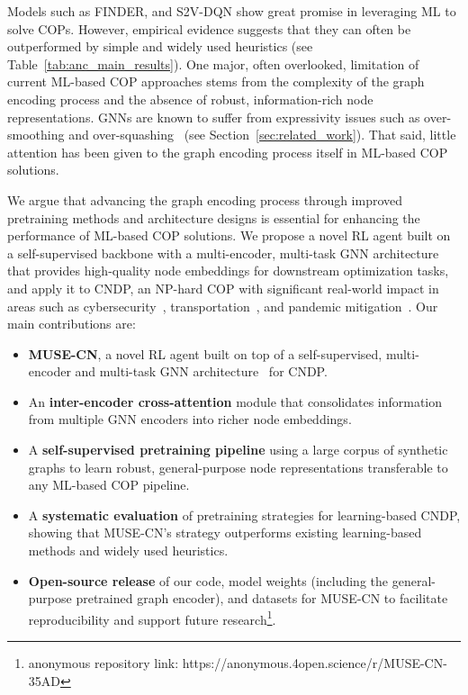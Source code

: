 \documentclass{article}
\begin{document}
Models such as FINDER, and S2V-DQN show great promise in leveraging ML to solve COPs. However, empirical evidence suggests that they can often be outperformed by simple and widely used heuristics (see Table~\ref{tab:anc_main_results}). One major, often overlooked, limitation of current ML-based COP approaches stems from the complexity of the graph encoding process and the absence of robust, information-rich node representations. GNNs are known to suffer from expressivity issues such as over-smoothing and over-squashing~\cite{rusch2023survey,topping2021understanding,xu2018powerful} (see Section~\ref{sec:related_work}). That said, little attention has been given to the graph encoding process itself in ML-based COP solutions.

We argue that advancing the graph encoding process through improved pretraining methods and architecture designs is essential for enhancing the performance of ML-based COP solutions. We propose a novel RL agent built on a self-supervised backbone with a multi-encoder, multi-task GNN architecture that provides high-quality node embeddings for downstream optimization tasks, and apply it to CNDP, an NP-hard COP with significant real-world impact in areas such as cybersecurity~\cite{lalou2018critical}, transportation~\cite{wang2021identification}, and pandemic mitigation~\cite{khoshbakhtian2024optimal}. Our main contributions are:

\begin{itemize}[leftmargin=*]
    \item \textbf{MUSE-CN}, a novel RL agent built on top of a self-supervised, multi-encoder and multi-task GNN architecture~\cite{khoshbakhtian2024mega} for CNDP.

    \item An \textbf{inter-encoder cross-attention} module that consolidates information from multiple GNN encoders into richer node embeddings.

    \item A \textbf{self-supervised pretraining pipeline} using a large corpus of synthetic graphs to learn robust, general-purpose node representations transferable to any ML-based COP pipeline.

    \item A \textbf{systematic evaluation} of pretraining strategies for learning-based CNDP, showing that MUSE-CN's strategy outperforms existing learning-based methods and widely used heuristics.

    \item \textbf{Open-source release} of our code, model weights (including the general-purpose pretrained graph encoder), and datasets for MUSE-CN to facilitate reproducibility and support future research\footnote{anonymous repository link: https://anonymous.4open.science/r/MUSE-CN-35AD}.
\end{itemize}
\end{document}
